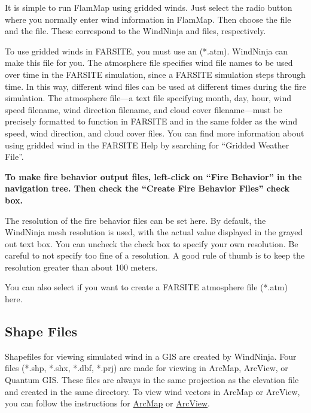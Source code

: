 \documentclass[12pt]{article}
\begin{document}
It is simple to run FlamMap using gridded winds.  Just select the  radio button where you normally enter wind information in FlamMap.  Then choose the  file and the  file.  These correspond to the WindNinja  and  files, respectively.

To use gridded winds in FARSITE, you must use an  (*.atm).  WindNinja can make this file for you.  The atmosphere file specifies wind file names to be used over time in the FARSITE simulation, since a FARSITE simulation steps through time.  In this way, different wind files can be used at different times during the fire simulation.  The atmosphere file—a text file specifying month, day, hour, wind speed filename, wind direction filename, and cloud cover filename—must be precisely formatted to function in FARSITE and in the same folder as the wind speed, wind direction, and cloud cover files.  You can find more information about using gridded wind in the FARSITE Help by searching for “Gridded Weather File”.

\textbf{\color{red} To make fire behavior output files, left-click on “Fire Behavior” in the navigation tree.  Then check the “Create Fire Behavior Files” check box.}

The resolution of the fire behavior files can be set here.  By default, the WindNinja mesh resolution is used, with the actual value displayed in the grayed out text box.  You can uncheck the  check box to specify your own resolution.  Be careful to not specify too fine of a resolution.  A good rule of thumb is to keep the resolution greater than about 100 meters.

You can also select if you want to create a FARSITE atmosphere file (*.atm) here.

\subsection{Shape Files}
Shapefiles for viewing simulated wind in a GIS are created by WindNinja.  Four files (*.shp, *.shx, *.dbf, *.prj) are made for viewing in ArcMap, ArcView, or Quantum GIS.  These files are always in the same projection as the elevation file and created in the same directory.  To view wind vectors in ArcMap or ArcView, you can follow the instructions for \href{http://firelab.github.io/windninja/pdf/displaying_wind_vectors_in_ArcMap.pdf}{ArcMap} or \href{http://firelab.github.io/windninja/pdf/displaying_wind_vectors_in_ArcView.pdf}{ArcView}.
\end{document}
